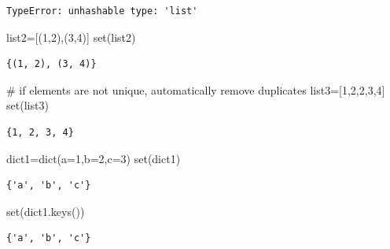 \documentclass[
  letterpaper,
  DIV=11,
  numbers=noendperiod]{scrreprt}
\newenvironment{Shaded}{\begin{snugshade}}{\end{snugshade}}
\newcommand{\BuiltInTok}[1]{\textcolor[rgb]{0.00,0.23,0.31}{#1}}
\newcommand{\CommentTok}[1]{\textcolor[rgb]{0.37,0.37,0.37}{#1}}
\newcommand{\DecValTok}[1]{\textcolor[rgb]{0.68,0.00,0.00}{#1}}
\newcommand{\NormalTok}[1]{\textcolor[rgb]{0.00,0.23,0.31}{#1}}
\newcommand{\OperatorTok}[1]{\textcolor[rgb]{0.37,0.37,0.37}{#1}}
\begin{document}
\begin{verbatim}
TypeError: unhashable type: 'list'
\end{verbatim}

\begin{Shaded}
\begin{Highlighting}[]
\NormalTok{list2}\OperatorTok{=}\NormalTok{[(}\DecValTok{1}\NormalTok{,}\DecValTok{2}\NormalTok{),(}\DecValTok{3}\NormalTok{,}\DecValTok{4}\NormalTok{)]}
\BuiltInTok{set}\NormalTok{(list2)}
\end{Highlighting}
\end{Shaded}

\begin{verbatim}
{(1, 2), (3, 4)}
\end{verbatim}

\begin{Shaded}
\begin{Highlighting}[]
\CommentTok{\# if elements are not unique, automatically remove duplicates}
\NormalTok{list3}\OperatorTok{=}\NormalTok{[}\DecValTok{1}\NormalTok{,}\DecValTok{2}\NormalTok{,}\DecValTok{2}\NormalTok{,}\DecValTok{3}\NormalTok{,}\DecValTok{4}\NormalTok{]}
\BuiltInTok{set}\NormalTok{(list3)}
\end{Highlighting}
\end{Shaded}

\begin{verbatim}
{1, 2, 3, 4}
\end{verbatim}

\begin{Shaded}
\begin{Highlighting}[]
\NormalTok{dict1}\OperatorTok{=}\BuiltInTok{dict}\NormalTok{(a}\OperatorTok{=}\DecValTok{1}\NormalTok{,b}\OperatorTok{=}\DecValTok{2}\NormalTok{,c}\OperatorTok{=}\DecValTok{3}\NormalTok{)}
\BuiltInTok{set}\NormalTok{(dict1)}
\end{Highlighting}
\end{Shaded}

\begin{verbatim}
{'a', 'b', 'c'}
\end{verbatim}

\begin{Shaded}
\begin{Highlighting}[]
\BuiltInTok{set}\NormalTok{(dict1.keys())}
\end{Highlighting}
\end{Shaded}

\begin{verbatim}
{'a', 'b', 'c'}
\end{verbatim}
\end{document}
